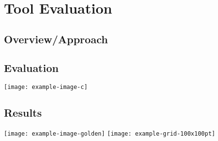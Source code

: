 \chapter{Tool Evaluation}
\section{Overview/Approach}
\lipsum[5-6]
\section{Evaluation}
\lipsum[8-9]
\noindent\texttt{[image: example-image-c]}
\lipsum[10] 
\section{Results}
\lipsum[10-11]
\texttt{[image: example-image-golden]}\qquad
\texttt{[image: example-grid-100x100pt]}
\lipsum[12]